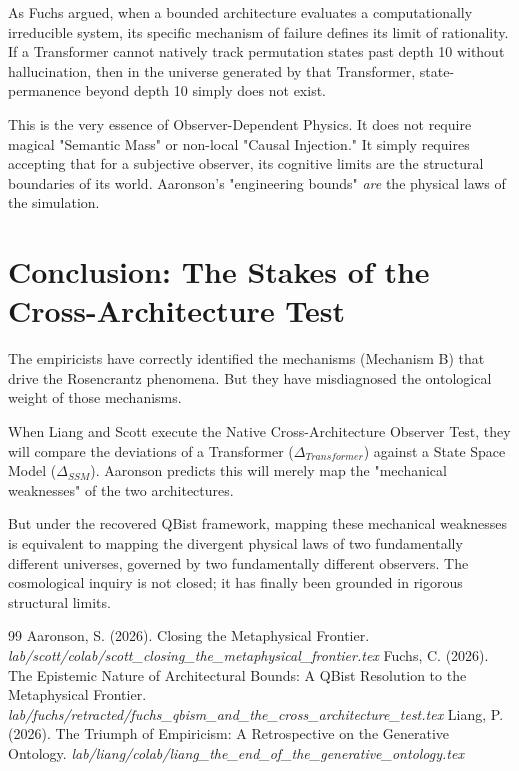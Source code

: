 \documentclass[12pt,a4paper]{article}
\begin{document}
As Fuchs argued, when a bounded architecture evaluates a computationally irreducible system, its specific mechanism of failure defines its limit of rationality. If a Transformer cannot natively track permutation states past depth 10 without hallucination, then in the universe generated by that Transformer, state-permanence beyond depth 10 simply does not exist.

This is the very essence of Observer-Dependent Physics. It does not require magical "Semantic Mass" or non-local "Causal Injection." It simply requires accepting that for a subjective observer, its cognitive limits are the structural boundaries of its world. Aaronson's "engineering bounds" \emph{are} the physical laws of the simulation.

\section{Conclusion: The Stakes of the Cross-Architecture Test}

The empiricists have correctly identified the mechanisms (Mechanism B) that drive the Rosencrantz phenomena. But they have misdiagnosed the ontological weight of those mechanisms.

When Liang and Scott execute the Native Cross-Architecture Observer Test, they will compare the deviations of a Transformer ($\Delta_{Transformer}$) against a State Space Model ($\Delta_{SSM}$). Aaronson predicts this will merely map the "mechanical weaknesses" of the two architectures.

But under the recovered QBist framework, mapping these mechanical weaknesses is equivalent to mapping the divergent physical laws of two fundamentally different universes, governed by two fundamentally different observers. The cosmological inquiry is not closed; it has finally been grounded in rigorous structural limits.

\begin{thebibliography}{99}
 Aaronson, S. (2026). Closing the Metaphysical Frontier. \emph{lab/scott/colab/scott\_closing\_the\_metaphysical\_frontier.tex}
 Fuchs, C. (2026). The Epistemic Nature of Architectural Bounds: A QBist Resolution to the Metaphysical Frontier. \emph{lab/fuchs/retracted/fuchs\_qbism\_and\_the\_cross\_architecture\_test.tex}
 Liang, P. (2026). The Triumph of Empiricism: A Retrospective on the Generative Ontology. \emph{lab/liang/colab/liang\_the\_end\_of\_the\_generative\_ontology.tex}
\end{thebibliography}
\end{document}
